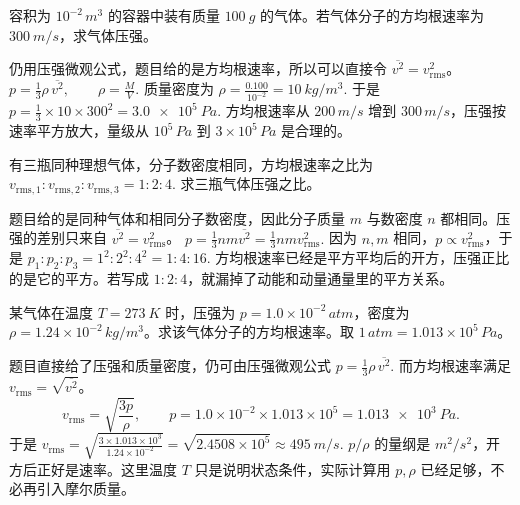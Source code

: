 \documentclass[lang=cn,11pt]{elegantbook}
\begin{document}
\begin{exercise}
容积为 \(10^{-2}\,\si{m^3}\) 的容器中装有质量 \(\SI{100}{g}\) 的气体。若气体分子的方均根速率为 \(\SI{300}{m/s}\)，求气体压强。
\end{exercise}

\begin{solution}
仍用压强微观公式，题目给的是方均根速率，所以可以直接令 \(\overline{v^2}=v_{\mathrm{rms}}^2\)。
 \(p=\frac13\rho\,\overline{v^2},\qquad \rho=\frac{M}{V}.\) 
质量密度为
 \(\rho=\frac{0.100}{10^{-2}}=\SI{10}{kg/m^3}.\) 
于是
 \(p=\frac13\times 10\times 300^2 =\SI{3.0e5}{Pa}.\) 
方均根速率从 \(200\,\si{m/s}\) 增到 \(300\,\si{m/s}\)，压强按速率平方放大，量级从 \(10^5\,\si{Pa}\) 到 \(3\times10^5\,\si{Pa}\) 是合理的。
\end{solution}

\begin{exercise}
有三瓶同种理想气体，分子数密度相同，方均根速率之比为
 \(v_{\mathrm{rms},1}:v_{\mathrm{rms},2}:v_{\mathrm{rms},3}=1:2:4.\) 
求三瓶气体压强之比。
\end{exercise}

\begin{solution}
题目给的是同种气体和相同分子数密度，因此分子质量 \(m\) 与数密度 \(n\) 都相同。压强的差别只来自 \(\overline{v^2}=v_{\mathrm{rms}}^2\)。
 \(p=\frac13 nm\overline{v^2} =\frac13nmv_{\mathrm{rms}}^2.\) 
因为 \(n,m\) 相同，\(p\propto v_{\mathrm{rms}}^2\)，于是
 \(p_1:p_2:p_3 =1^2:2^2:4^2 =1:4:16.\) 
方均根速率已经是平方平均后的开方，压强正比的是它的平方。若写成 \(1:2:4\)，就漏掉了动能和动量通量里的平方关系。
\end{solution}

\begin{exercise}
某气体在温度 \(T=\SI{273}{K}\) 时，压强为 \(p=1.0\times10^{-2}\,\si{atm}\)，密度为 \(\rho=1.24\times10^{-2}\,\si{kg/m^3}\)。求该气体分子的方均根速率。取 \(1\,\si{atm}=1.013\times10^5\,\si{Pa}\)。
\end{exercise}

\begin{solution}
题目直接给了压强和质量密度，仍可由压强微观公式
 \(p=\frac13\rho\,\overline{v^2}.\) 
而方均根速率满足 \(v_{\mathrm{rms}}=\sqrt{\overline{v^2}}\)。
\[
v_{\mathrm{rms}}=\sqrt{\frac{3p}{\rho}},\qquad
p=1.0\times10^{-2}\times1.013\times10^5=\SI{1.013e3}{Pa}.
\]
于是
 \(v_{\mathrm{rms}} =\sqrt{\frac{3\times1.013\times10^3}{1.24\times10^{-2}}} =\sqrt{2.4508\times10^5} \approx \SI{495}{m/s}.\) 
\(p/\rho\) 的量纲是 \(\si{m^2/s^2}\)，开方后正好是速率。这里温度 \(T\) 只是说明状态条件，实际计算用 \(p,\rho\) 已经足够，不必再引入摩尔质量。
\end{solution}
\end{document}
